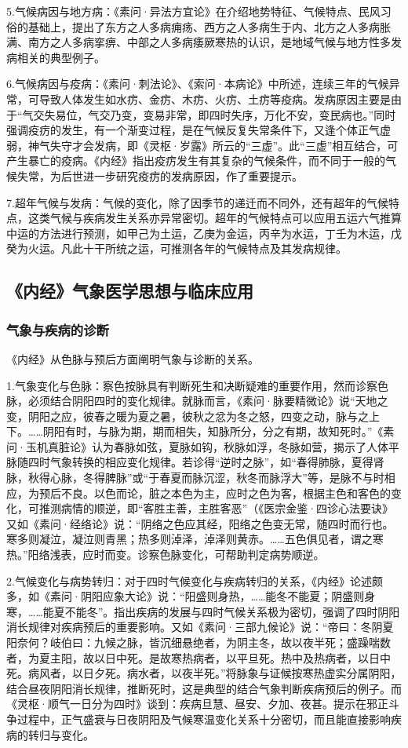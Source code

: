 \documentclass[draft,12pt]{ctexbook}
\begin{document}
5.气候病因与地方病：《素问·异法方宜论》在介绍地势特征、气候特点、民风习俗的基础上，提出了东方之人多病痈疡、西方之人多病生于内、北方之人多病胀满、南方之人多病挛痹、中部之人多病痿厥寒热的认识，是地域气候与地方性多发病相关的典型例子。

6.气候病因与疫病：《素问·刺法论》、《索问·本病论》中所述，连续三年的气候异常，可导致人体发生如水疠、金疠、木疠、火疠、土疠等疫病。发病原因主要是由于“气交失易位，气交乃变，变易非常，即四时失序，万化不安，变民病也。”同时强调疫疠的发生，有一个渐变过程，是在气候反复失常条件下，又逢个体正气虚弱，神气失守才会发病，即《灵枢·岁露》所云的“三虚”。此“三虚”相互结合，可产生暴亡的疫病。《内经》指出疫疠发生有其复杂的气候条件，而不同于一般的气候失常，为后世进一步研究疫疠的发病原因，作了重要提示。

7.超年气候与发病：气候的变化，除了因季节的递迁而不同外，还有超年的气候特点，这类气候与疾病发生关系亦异常密切。超年的气候特点可以应用五运六气推算中运的方法进行预测，如甲己为土运，乙庚为金运，丙辛为水运，丁壬为木运，戊癸为火运。凡此十干所统之运，可推测各年的气候特点及其发病规律。

\subsection{《内经》气象医学思想与临床应用}%

\subsubsection{气象与疾病的诊断}%

《内经》从色脉与预后方面阐明气象与诊断的关系。

1.气象变化与色脉：察色按脉具有判断死生和决断疑难的重要作用，然而诊察色脉，必须结合阴阳四时的变化规律。就脉而言，《素问·脉要精微论》说“天地之变，阴阳之应，彼春之暖为夏之暑，彼秋之忿为冬之怒，四变之动，脉与之上下。……阴阳有时，与脉为期，期而相失，知脉所分，分之有期，故知死时。”《素问·玉机真脏论》认为春脉如弦，夏脉如钩，秋脉如浮，冬脉如营，揭示了人体平脉随四时气象转换的相应变化规律。若诊得“逆时之脉”，如“春得肺脉，夏得肾脉，秋得心脉，冬得脾脉”或“于春夏而脉沉涩，秋冬而脉浮大”等，是脉不与时相应，为预后不良。以色而论，脏之本色为主，应时之色为客，根据主色和客色的变化，可推测病情的顺逆，即“客胜主善，主胜客恶”（《医宗金鉴·四诊心法要诀》又如《素问·经络论》说：“阴络之色应其经，阳络之色变无常，随四时而行也。寒多则凝泣，凝泣则青黑；热多则淖泽，淖泽则黄赤。……五色俱见者，谓之寒热。”阳络浅表，应时而变。诊察色脉变化，可帮助判定病势顺逆。

2.气候变化与病势转归：对于四时气候变化与疾病转归的关系，《内经》论述颇多，如《素问·阴阳应象大论》说：“阳盛则身热，……能冬不能夏；阴盛则身寒，……能夏不能冬”。指出疾病的发展与四时气候关系极为密切，强调了四时阴阳消长规律对疾病预后的重要影响。又如《素问·三部九候论》说：“帝曰：冬阴夏阳奈何？岐伯曰：九候之脉，皆沉细悬绝者，为阴主冬，故以夜半死；盛躁喘数者，为夏主阳，故以日中死。是故寒热病者，以平旦死。热中及热病者，以日中死。病风者，以日夕死。病水者，以夜半死。”将脉象与证候按寒热虚实分属阴阳，结合昼夜阴阳消长规律，推断死时，这是典型的结合气象判断疾病预后的例子。而《灵枢·顺气一日分为四时》谈到：疾病旦慧、昼安、夕加、夜甚。提示在邪正斗争过程中，正气盛衰与日夜阴阳及气候寒温变化关系十分密切，而且能直接影响疾病的转归与变化。
\end{document}
